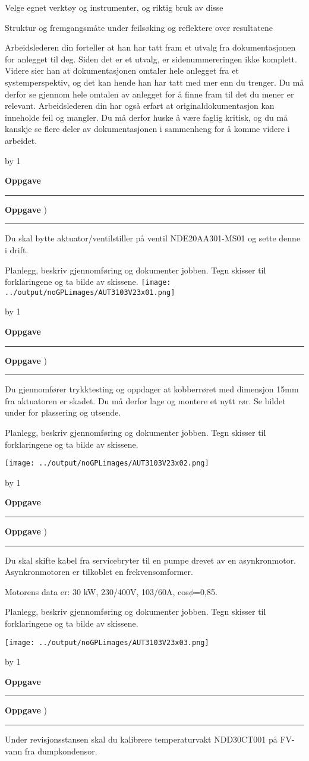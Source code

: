 \documentclass[12pt,a4paper]{article}
\def\oppgave{
            \advance\questnum by 1
	    \ifthenelse{\questnum>0\AND \questnum<9}
	    {
                \vskip 1cm
		\textbf{Oppgave}\hskip 5pt\the\questnum \hfill \hfill
		\vskip 3pt
		\hrule
	\vskip 0.5cm}
	{
                \vskip 1cm
		\textbf{Oppgave}\hskip 5pt \the\questnum \hfill \hfill)
		\vskip 3pt \hrule \vskip 0.5cm }

		}
\begin{document}
Velge egnet verktøy og instrumenter, og riktig bruk av disse

Struktur og fremgangsmåte under feilsøking og reflektere over resultatene

\vskip  0.25cm
 

Arbeidslederen din forteller at han har tatt fram et utvalg fra dokumentasjonen for anlegget til deg. Siden det er et utvalg, er sidenummereringen ikke komplett. Videre sier han at dokumentasjonen omtaler hele anlegget fra et systemperspektiv, og det kan hende han har tatt med mer enn du trenger. Du må derfor se gjennom hele omtalen av anlegget for å finne fram til det du mener er relevant. Arbeidslederen din har også erfart at originaldokumentasjon kan inneholde feil og mangler. Du må derfor huske å være faglig kritisk, og du må kanskje se flere deler av dokumentasjonen i sammenheng for å komme videre i arbeidet.
\oppgave{}%
Du skal bytte aktuator/ventilstiller på ventil NDE20AA301-MS01 og sette denne i drift. 
\vskip 0.25cm

Planlegg, beskriv gjennomføring og dokumenter jobben. Tegn skisser til forklaringene og ta bilde av skissene. 
\vskip 0.25cm
\texttt{[image: ../output/noGPLimages/AUT3103V23x01.png]}\\
\newpage
\oppgave{}%
Du gjennomfører trykktesting og oppdager at kobberrøret med dimensjon 15mm fra aktuatoren er skadet. Du må derfor lage og montere et nytt rør. Se bildet under for plassering og utsende. 

\vskip 0.25cm
Planlegg, beskriv gjennomføring og dokumenter jobben. Tegn skisser til forklaringene og ta bilde av skissene.

\vskip 0.25cm
\texttt{[image: ../output/noGPLimages/AUT3103V23x02.png]}\\
\newpage
\oppgave{}%
Du skal skifte kabel fra servicebryter til en pumpe drevet av en asynkronmotor. Asynkronmotoren er tilkoblet en frekvensomformer. 

\vskip 0.25cm
Motorens data er: 30 kW, 230/400V, 103/60A, cos$\phi$=0,85. 

\vskip 0.25cm
Planlegg, beskriv gjennomføring og dokumenter jobben. Tegn skisser til forklaringene og ta bilde av skissene.

\vskip 0.25cm
\texttt{[image: ../output/noGPLimages/AUT3103V23x03.png]}\\
\newpage
\oppgave{}%
Under revisjonsstansen skal du kalibrere temperaturvakt NDD30CT001 på FV-vann fra dumpkondensor. 
\end{document}
